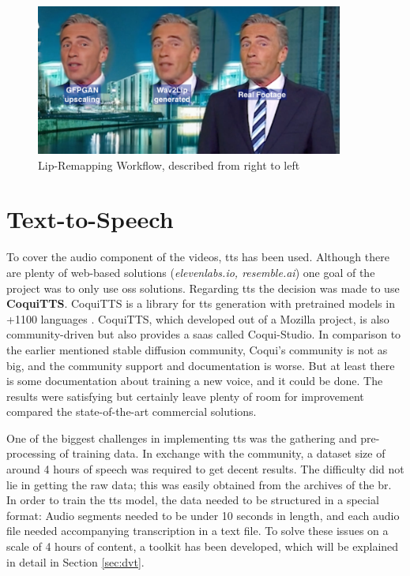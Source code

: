 \documentclass[
  a4paper,  %
  twoside,  %
  bibliography=totoc,
  headsepline,
  cleardoublepage=empty,
  parskip=half,
  draft=false
]{scrbook}
\begin{document}
\begin{figure}[h]
  \centering
  \includegraphics[width=0.9\textwidth]{./graphics/wav2lip/wav2lip-demo.png}
  \caption{Lip-Remapping Workflow, described from right to left}
  \label{fig:wav2lip-demo}
\end{figure}

\section{Text-to-Speech}
\label{sec:tts}
To cover the audio component of the videos, \gls{tts} has been used. Although there are plenty of web-based solutions (\textit{elevenlabs.io, resemble.ai}) one goal of the project was to only use \gls{oss} solutions. Regarding \gls*{tts} the decision was made to use \textbf{CoquiTTS}. CoquiTTS is a library for \gls{tts} generation with pretrained models in +1100 languages \cite{erenCoquiTTS2021}. CoquiTTS, which developed out of a Mozilla project, is also community-driven but also provides a \gls{saas} called Coqui-Studio. In comparison to the earlier mentioned stable diffusion community, Coqui's community is not as big, and the community support and documentation is worse. But at least there is some documentation about training a new voice, and it could be done. The results were satisfying but certainly leave plenty of room for improvement compared the state-of-the-art commercial solutions.

One of the biggest challenges in implementing \gls{tts} was the gathering and pre-processing of training data. In exchange with the community, a dataset size of around 4 hours of speech was required to get decent results. The difficulty did not lie in getting the raw data; this was easily obtained from the archives of the \gls{br}. In order to train the \gls{tts} model, the data needed to be structured in a special format: Audio segments needed to be under 10 seconds in length, and each audio file needed accompanying transcription in a text file. To solve these issues on a scale of 4 hours of content, a toolkit has been developed, which will be explained in detail in Section \ref{sec:dvt}.
\end{document}

